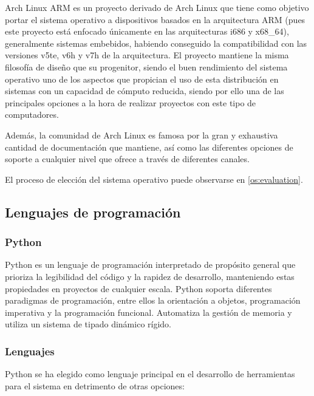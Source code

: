 Arch Linux ARM es un proyecto derivado de Arch Linux que tiene como objetivo portar el sistema operativo a dispositivos basados en la arquitectura ARM (pues este proyecto está enfocado únicamente en las arquitecturas i686 y x68\_64\citationneeded), generalmente sistemas embebidos, habiendo conseguido la compatibilidad con las versiones v5te, v6h y v7h de la arquitectura\citationneeded. El proyecto mantiene la misma filosofía de diseño que su progenitor, siendo el buen rendimiento del sistema operativo uno de los aspectos que propician el uso de esta distribución en sistemas con un capacidad de cómputo reducida, siendo por ello una de las principales opciones a la hora de realizar proyectos con este tipo de computadores.%

Además, la comunidad de Arch Linux es famosa por la gran y exhaustiva cantidad de documentación que mantiene, así como las diferentes opciones de soporte a cualquier nivel que ofrece a través de diferentes canales\citationneeded.

El proceso de elección del sistema operativo puede observarse en \ref{os:evaluation}.

\subsection{Lenguajes de programación}

\subsubsection{Python}
Python es un lenguaje de programación interpretado de propósito general que prioriza la legibilidad del  código y la rapidez de desarrollo, manteniendo estas propiedades en proyectos de cualquier escala. Python soporta diferentes paradigmas de programación, entre ellos la orientación a objetos, programación imperativa y la programación funcional. Automatiza la gestión de memoria y utiliza un sistema de tipado dinámico rígido\citationneeded.

\subsubsection{Lenguajes}

Python se ha elegido como lenguaje principal en el desarrollo de herramientas para el sistema en detrimento de otras opciones:

